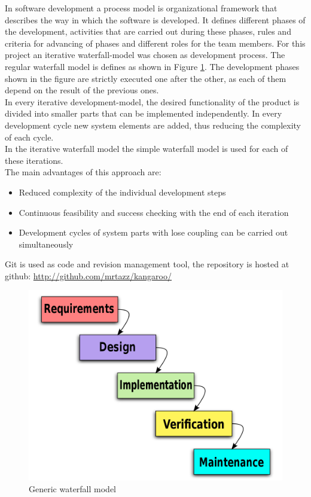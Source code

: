 In software development a process model is organizational framework that describes the way in which the software is developed. It defines different phases of the development, activities that are carried out during these phases, rules and criteria for advancing of phases and different roles for the team members. For this project an iterative waterfall-model was chosen as development process. 
The regular waterfall model is defines as shown in Figure \ref{waterfall}. The development phases shown in the figure are strictly executed one after the other, as each of them depend on the result of the previous ones. \\ In every iterative development-model, the desired functionality of the product is divided into smaller parts that can be implemented independently. In every development cycle new system elements are added, thus reducing the  complexity of each cycle.\\ In the iterative waterfall model the simple waterfall model is used for each of these iterations. \\ The main advantages of this approach are:
\begin{itemize}
\item Reduced complexity of the individual development steps
\item Continuous feasibility and success checking with the end of each iteration
\item Development cycles of system parts with lose coupling can be carried out simultaneously
\end{itemize}
Git is used as code and revision management tool, the repository is hosted at github: \url{http://github.com/mrtazz/kangaroo/}
\begin{figure}[h!]
\centering
\includegraphics[width=14cm]{pics/waterfall.png}
\caption{Generic waterfall model}
\label{waterfall}
\end{figure}  


